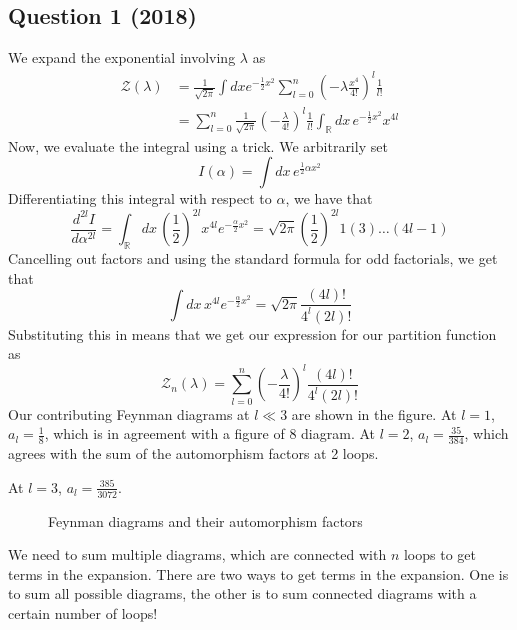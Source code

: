 \documentclass[11pt, oneside]{article}   	%
\theoremstyle{slanted}
\begin{document}
\subsection*{Question 1 (2018)}
We expand the exponential 
involving $ \lambda $ as 
\begin{align*}
	\mathcal{ Z } \left( \lambda  \right)   & = \frac{1}{\sqrt{ 2 \pi }  } 
	\int dx e ^{  - \frac{1}{2 } x ^ 2 } \sum_{ l = 0 } ^ n 
	\left(  - \lambda \frac{x ^ 4 }{ 4 ! }  \right)  ^ l \frac{1}{l ! } \\
						&=  \sum_{l = 0 }^{ n }  \frac{1}{\sqrt{ 2 \pi }  } \left(  - \frac{\lambda}{4 ! }  \right) ^{ l } \frac{1}{l ! } \int_{ \mathbb{ R } } dx \, 
						e ^{  - \frac{1}{2 } x ^ 2 } x ^{ 4l } 
\end{align*}
Now, we evaluate the integral using a trick. 
We arbitrarily set 
\[
 I ( \alpha )  = \int dx \, e ^{ \frac{1}{2 } \alpha x ^ 2 } 
\] Differentiating this integral with respect to $ \alpha $, 
we have that 
\[
	\frac{d ^{ 2l } I }{ d \alpha ^{ 2l } }  = \int_{ \mathbb{ R } } 
	dx \, \left( \frac{1}{2 }  \right)^{ 2l } x ^{ 4l } e ^{  - \frac{\alpha}{2 } x ^ 2 }
	= \sqrt{ 2 \pi }  \left( \frac{1}{2 }  \right)  ^{ 2l } 1 \left( 3  \right)  \dots 
	\left( 4l - 1  \right)  
\] Cancelling out factors and using the 
standard formula for odd factorials, 
we get that 
\[
	\int dx \, x ^{ 4l } e ^{  - \frac{\alpha}{2 } x ^ 2 }  = \sqrt{ 2 \pi }  \frac{\left( 4l  \right)  ! }{ 4 ^ l \left( 2l  \right)  ! }
\] Substituting this in 
means that we get our expression for our 
partition function as 
\[
	\mathcal{ Z } _ n \left( \lambda  \right)   = 
	\sum_{ l = 0 } ^ n \left( - \frac{ \lambda }{ 4 ! }  \right)^{ l } 
	\frac{\left( 4l  \right)  ! }{  4 ^ l \left( 2l  \right)  ! }
\]
Our contributing Feynman diagrams 
at $ l \ll 3 $ are shown in the figure.
At $ l  = 1$,  $a_ l = \frac{1}{8 } $, 
which is in agreement with a figure of $ 8 $ 
diagram. At $l  =2  $, $ a _ l  = \frac{35}{384}$, 
which agrees with the sum of the automorphism factors 
at 2 loops.

At  $l = 3 $, $ a _ l = \frac{385}{ 3072}$. 

\begin{figure}[htpb]
	\centering
	
	\caption{Feynman diagrams and their automorphism 
	factors}%
	\label{fig:}
\end{figure}
We need to sum multiple diagrams, 
which are connected with $ n $ loops to get terms in the 
expansion. 
There are two ways to get terms in the expansion. 
One is to sum all possible diagrams, 
the other is to sum connected diagrams with a certain number of loops! 
\end{document}
